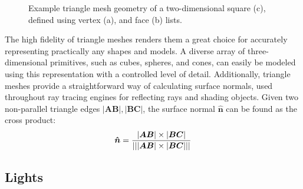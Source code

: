 \begin{figure}[!ht]
\begin{subfigure}{.35\textwidth}
        \caption{}
    \end{subfigure}

    \caption[Example triangle mesh geometry of a two-dimensional square]{
        Example triangle mesh geometry of a two-dimensional square (c), defined using vertex (a), and face (b) lists.}
    \label{fig:Implementation/SceneRepresentation/mesh}
\end{figure}

The high fidelity of triangle meshes renders them a great choice for accurately representing practically any shapes and models.
A diverse array of three-dimensional primitives, such as cubes, spheres, and cones, can easily be modeled using this representation with a controlled level of detail. 
Additionally, triangle meshes provide a straightforward way of calculating surface normals, used throughout ray tracing engines for reflecting rays and shading objects.
Given two non-parallel triangle edges $ |\bm{AB}|, |\bm{BC}| $, the surface normal $ \bm{\hat{n}} $ can be found as the cross product:
%
\begin{equation}
    \bm{\hat{n}} = \frac{|\bm{AB}|\times|\bm{BC}|}{\lvert\lvert |\bm{AB}|\times|\bm{BC}| \rvert\rvert}
\end{equation}

\subsection{Lights}

